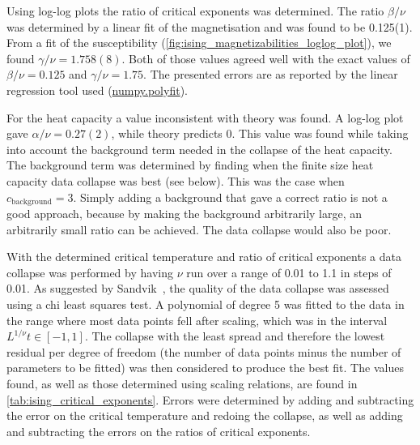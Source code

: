 \documentclass[11pt, a4paper]{report} %
\begin{document}
Using log-log plots the ratio of critical exponents was determined.
The ratio \(\beta/\nu\) was determined by a linear fit of the magnetisation and was found to be 0.125(1).
From a fit of the susceptibility (\cref{fig:ising_magnetizabilities_loglog_plot}), we found \(\gamma/\nu = 1.758(8)\).
Both of those values agreed well with the exact values of \(\beta/\nu = 0.125\) and \(\gamma/\nu = 1.75\).
The presented errors are as reported by the linear regression tool used (\url{numpy.polyfit}).

For the heat capacity a value inconsistent with theory was found.
A log-log plot gave \(\alpha /\nu = 0.27(2)\), while theory predicts 0.
This value was found while taking into account the background term needed in the collapse of the heat capacity.
The background term was determined by finding when the finite size heat capacity data collapse was best (see below). This was the case when \(c_{\mathrm{background}} = 3\).
Simply adding a background that gave a correct ratio is not a good approach, because by making the background arbitrarily large, an arbitrarily small ratio can be achieved.
The data collapse would also be poor.

With the determined critical temperature and ratio of critical exponents a data collapse was performed by having \(\nu\) run over a range of 0.01 to 1.1 in steps of 0.01.
As suggested by Sandvik~\cite{sandvik:2011}, the quality of the data collapse was assessed using a chi least squares test.
A polynomial of degree 5 was fitted to the data in the range where most data points fell after scaling, which was in the interval \(L^{1/\nu}t \in [-1, 1]\).
The collapse with the least spread and therefore the lowest residual per degree of freedom (the number of data points minus the number of parameters to be fitted) was then considered to produce the best fit.
The values found, as well as those determined using scaling relations, are found in \cref{tab:ising_critical_exponents}.
Errors were determined by adding and subtracting the error on the critical temperature and redoing the collapse, as well as adding and subtracting the errors on the ratios of critical exponents.
\end{document}
